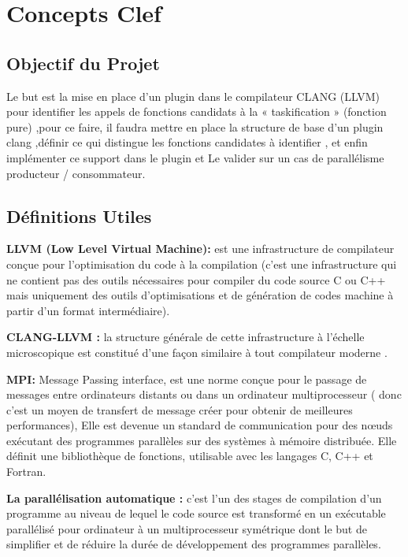 \documentclass[12pt,a4paper]{article}
\begin{document}
\section{Concepts Clef}

\subsection{Objectif du Projet}

Le but est la mise en place d’un plugin dans le compilateur CLANG (LLVM) pour identifier les appels de fonctions candidats à la « taskification » (fonction pure) ,pour ce faire, il faudra mettre en place la structure de base d’un plugin clang ,définir ce qui distingue les fonctions candidates à identifier , et enfin implémenter ce support dans le plugin et  Le valider sur un cas de parallélisme producteur / consommateur.

\subsection{Définitions Utiles} 
	
\textbf{ LLVM (Low Level Virtual Machine):} est une infrastructure de compilateur conçue pour l'optimisation du code à la compilation (c’est une infrastructure qui ne contient pas des outils nécessaires pour compiler du code source C ou C++ mais uniquement des outils d’optimisations et de génération de codes machine à partir d’un format intermédiaire).\cite{clangllvm}
              
\textbf{CLANG-LLVM :} la structure générale de cette infrastructure à l’échelle microscopique est constitué d’une façon similaire à tout compilateur moderne .\cite{clangllvm}


\textbf{ MPI:} Message Passing interface, est une norme conçue pour le passage de messages entre ordinateurs distants ou dans un ordinateur multiprocesseur ( donc c’est un moyen de transfert de message créer pour obtenir de meilleures performances), Elle est devenue un standard de communication pour des nœuds exécutant des programmes parallèles sur des systèmes à mémoire distribuée. Elle définit une bibliothèque de fonctions, utilisable avec les langages C, C++ et Fortran.\cite{wiki}


\textbf{ La parallélisation automatique :} c’est l’un des stages de compilation d’un programme au niveau de lequel le code source est transformé  en un exécutable parallélisé pour ordinateur à un multiprocesseur symétrique dont le but de simplifier et de réduire la durée de développement des programmes parallèles.\cite{wiki}
\end{document}
